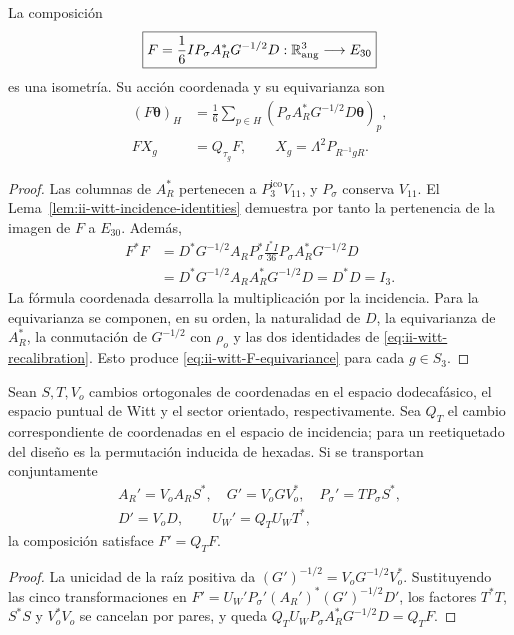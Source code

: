 \begin{theorem}
\label{thm:ii-witt-angular-transport}
La composición
\begin{equation}
 \boxed{F=\frac16 I P_\sigma A_R^*G^{-1/2}D:
        \mathbb R^3_{\rm ang}\longrightarrow E_{30}}
 \label{eq:ii-witt-F}
\end{equation}
es una isometría. Su acción coordenada y su equivarianza son
\begin{align}
 (F\boldsymbol\theta)_H
 &=\frac16\sum_{p\in H}
       (P_\sigma A_R^*G^{-1/2}D\boldsymbol\theta)_p,
       \label{eq:ii-witt-F-coordinates}\\
 F X_g&=Q_{\tau_g}F,
 \qquad X_g=\Lambda^2P_{R^{-1}gR}.
       \label{eq:ii-witt-F-equivariance}
\end{align}
\end{theorem}
\begin{proof}
Las columnas de \(A_R^*\) pertenecen a \(P_3^{\mathrm{ico}}V_{11}\), y
\(P_\sigma\) conserva \(V_{11}\). El
Lema~\ref{lem:ii-witt-incidence-identities} demuestra por tanto la
pertenencia de la imagen de \(F\) a \(E_{30}\). Además,
\begin{align*}
 F^*F
 &=D^*G^{-1/2}A_RP_\sigma^*
       \frac{I^*I}{36}P_\sigma A_R^*G^{-1/2}D\\
 &=D^*G^{-1/2}A_RA_R^*G^{-1/2}D
  =D^*D=I_3.
\end{align*}
La fórmula coordenada desarrolla la multiplicación por la incidencia.
Para la equivarianza se componen, en su orden, la naturalidad de \(D\),
la equivarianza de \(A_R^*\), la conmutación de \(G^{-1/2}\) con
\(\rho_o\) y las dos identidades de
\eqref{eq:ii-witt-recalibration}. Esto produce
\eqref{eq:ii-witt-F-equivariance} para cada \(g\in S_3\).
\end{proof}

\begin{proposition}
\label{prop:ii-witt-gauge-covariance}
Sean \(S,T,V_o\) cambios ortogonales de coordenadas en el espacio
dodecafásico, el espacio puntual de Witt y el sector orientado,
respectivamente. Sea \(Q_T\) el cambio correspondiente de coordenadas
en el espacio de incidencia; para un reetiquetado del diseño es la
permutación inducida de hexadas. Si se transportan conjuntamente
\[
\begin{gathered}
 A_R'=V_oA_RS^*,\quad G'=V_oGV_o^*,\quad
 P_\sigma'=TP_\sigma S^*,\\
 D'=V_oD,\qquad U_W'=Q_TU_WT^*,
\end{gathered}
\]
la composición satisface \(F'=Q_TF\).
\end{proposition}
\begin{proof}
La unicidad de la raíz positiva da
\((G')^{-1/2}=V_oG^{-1/2}V_o^*\). Sustituyendo las cinco
transformaciones en
\(F'=U_W'P_\sigma'(A_R')^*(G')^{-1/2}D'\), los factores
\(T^*T\), \(S^*S\) y \(V_o^*V_o\) se cancelan por pares, y queda
\(Q_TU_WP_\sigma A_R^*G^{-1/2}D=Q_TF\).
\end{proof}

